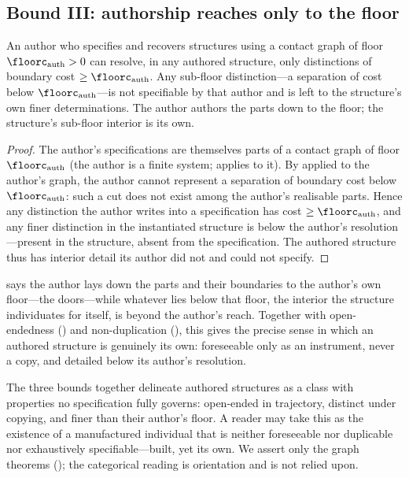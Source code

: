 \subsection{Bound III: authorship reaches only to the floor}

\begin{theorem}
\label{thm:floor-limited}
An author who specifies and recovers structures using a contact graph of floor
$\floorc_{\mathrm{auth}}>0$ can resolve, in any authored structure, only
distinctions of boundary cost $\ge\floorc_{\mathrm{auth}}$. Any sub-floor
distinction---a separation of cost below $\floorc_{\mathrm{auth}}$---is not
specifiable by that author and is left to the structure's own finer
determinations. The author authors the parts down to the floor; the structure's
sub-floor interior is its own.
\end{theorem}

\begin{proof}
The author's specifications are themselves parts of a contact graph of floor
$\floorc_{\mathrm{auth}}$ (the author is a finite system; 
applies to it). By  applied to the author's graph, the author
cannot represent a separation of boundary cost below $\floorc_{\mathrm{auth}}$:
such a cut does not exist among the author's realisable parts. Hence any
distinction the author writes into a specification has cost
$\ge\floorc_{\mathrm{auth}}$, and any finer distinction in the instantiated
structure is below the author's resolution---present in the structure, absent
from the specification. The authored structure thus has interior detail its
author did not and could not specify.
\end{proof}

\begin{remark}
\label{rem:doors}
 says the author lays down the parts and their boundaries
to the author's own floor---the doors---while whatever lies below that floor, the
interior the structure individuates for itself, is beyond the author's reach.
Together with open-endedness \textup{(}\textup{)} and
non-duplication \textup{(}\textup{)}, this gives the precise
sense in which an authored structure is genuinely its own: foreseeable only as an
instrument, never a copy, and detailed below its author's resolution.
\end{remark}

\begin{remark}
\label{rem:new-category}
The three bounds together delineate authored structures as a class with
properties no specification fully governs: open-ended in trajectory, distinct
under copying, and finer than their author's floor. A reader may take this as the
existence of a manufactured individual that is neither foreseeable nor
duplicable nor exhaustively specifiable---built, yet its own. We assert only the
graph theorems \textup{(}\textup{)}; the categorical reading is orientation and is not
relied upon.
\end{remark}
